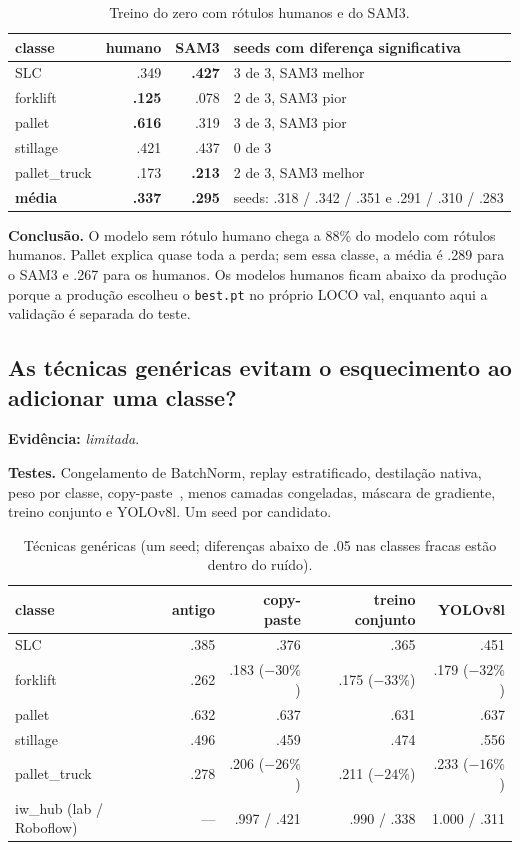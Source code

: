 \documentclass[11pt,a4paper]{article}
\newcommand{\evidencia}[1]{\noindent\textbf{Evidência:} \emph{#1}.\par}
\newcommand{\testes}{\noindent\textbf{Testes.} }
\newcommand{\conclusao}{\noindent\textbf{Conclusão.} }
\begin{document}
\begin{table}[H]
\centering\small
\caption{Treino do zero com rótulos humanos e do SAM3.}
\begin{tabular}{lrrl}
\toprule
classe & humano & SAM3 & seeds com diferença significativa \\
\midrule
SLC & .349 & \textbf{.427} & 3 de 3, SAM3 melhor \\
forklift & \textbf{.125} & .078 & 2 de 3, SAM3 pior \\
pallet & \textbf{.616} & .319 & 3 de 3, SAM3 pior \\
stillage & .421 & .437 & 0 de 3 \\
pallet\_truck & .173 & \textbf{.213} & 2 de 3, SAM3 melhor \\
\textbf{média} & \textbf{.337} & \textbf{.295} & seeds: .318 / .342 / .351 e .291 / .310 / .283 \\
\bottomrule
\end{tabular}
\end{table}

\conclusao O modelo sem rótulo humano chega a 88\% do modelo com rótulos humanos.
Pallet explica quase toda a perda; sem essa classe, a média é .289 para o SAM3 e
.267 para os humanos. Os modelos humanos ficam abaixo da produção porque a
produção escolheu o \texttt{best.pt} no próprio LOCO val, enquanto aqui a
validação é separada do teste.

\subsection{As técnicas genéricas evitam o esquecimento ao adicionar uma classe?}
\evidencia{limitada}

\testes Congelamento de BatchNorm, replay estratificado, destilação nativa, peso
por classe, copy-paste~\cite{copypaste}, menos camadas congeladas, máscara de
gradiente, treino conjunto e YOLOv8l. Um seed por candidato.

\begin{table}[H]
\centering\small
\caption{Técnicas genéricas (um seed; diferenças abaixo de .05 nas classes fracas
estão dentro do ruído).}
\begin{tabular}{lrrrr}
\toprule
classe & antigo & copy-paste & treino conjunto & YOLOv8l \\
\midrule
SLC & .385 & .376 & .365 & .451 \\
forklift & .262 & .183 ($-30\%$) & .175 ($-33\%$) & .179 ($-32\%$) \\
pallet & .632 & .637 & .631 & .637 \\
stillage & .496 & .459 & .474 & .556 \\
pallet\_truck & .278 & .206 ($-26\%$) & .211 ($-24\%$) & .233 ($-16\%$) \\
iw\_hub (lab / Roboflow) & --- & .997 / .421 & .990 / .338 & 1.000 / .311 \\
\bottomrule
\end{tabular}
\end{table}
\end{document}

